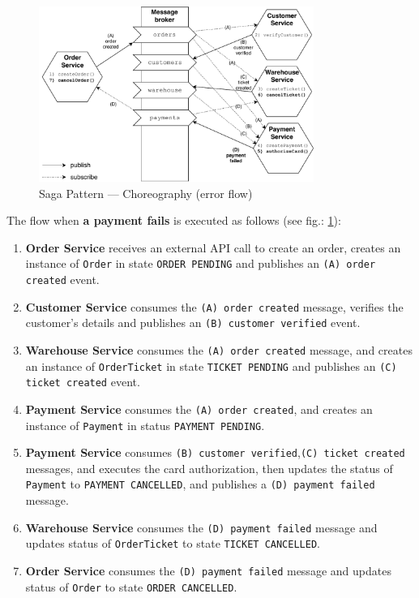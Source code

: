 \documentclass[thesis=M,english,hidelinks]{FITthesis}[2012/10/20]
\begin{document}
\begin{figure}[!ht]
  \centering
    \includegraphics[width=0.8\textwidth]{images/saga-chor-fail.pdf}
    \caption{Saga Pattern --- Choreography (error flow)}
    \label{fig:saga-chor-fail}
\end{figure}
\noindent
The flow when \textbf{a payment fails} is executed as follows (see fig.: \ref{fig:saga-chor-fail}):
\begin{enumerate}
    \item \textbf{Order Service} receives an external \acrshort{API} call to create an order, creates an instance of \texttt{Order} in state \texttt{ORDER PENDING} and publishes an \texttt{(A) order created} event.
    \item \textbf{Customer Service} consumes the \texttt{(A) order created} message, verifies the customer's details and publishes an \texttt{(B) customer verified} event.
    \item \textbf{Warehouse Service} consumes the \texttt{(A) order created} message, and creates an instance of \texttt{OrderTicket} in state \texttt{TICKET PENDING} and publishes an \texttt{(C) ticket created} event.
    \item \textbf{Payment Service} consumes the \texttt{(A) order created}, and creates an instance of \texttt{Payment} in status \texttt{PAYMENT PENDING}.
    \item \textbf{Payment Service} consumes \texttt{(B) customer verified},\break\texttt{(C) ticket created} messages, and executes the card authorization, then updates the status of \texttt{Payment} to \texttt{PAYMENT CANCELLED}, and publishes a \texttt{(D) payment failed} message.
    \item \textbf{Warehouse Service} consumes the \texttt{(D) payment failed} message and updates status of \texttt{OrderTicket} to state \texttt{TICKET CANCELLED}.
    \item \textbf{Order Service} consumes the \texttt{(D) payment failed} message and updates status of \texttt{Order} to state \texttt{ORDER CANCELLED}.
\end{enumerate}
\end{document}
